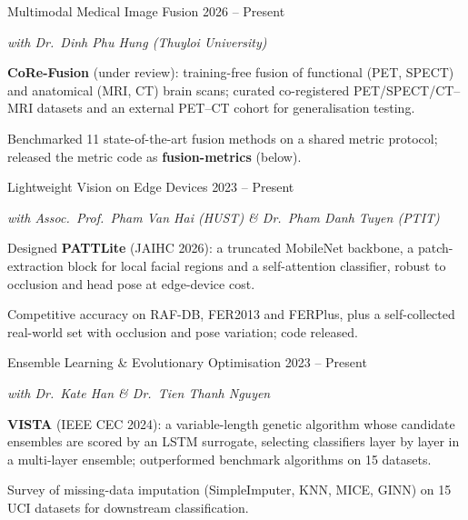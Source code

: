 \begin{cventries}
  \cventry
    {Multimodal Medical Image Fusion}
    {2026 -- Present}
    {
      \begin{cvitems}
        \item[] {\textit{with Dr.\ Dinh Phu Hung (Thuyloi University)}}
        \item {\textbf{CoRe-Fusion} (under review): training-free fusion of functional (PET, SPECT) and anatomical (MRI, CT) brain scans; curated co-registered PET/SPECT/CT--MRI datasets and an external PET--CT cohort for generalisation testing.}
        \item {Benchmarked 11 state-of-the-art fusion methods on a shared metric protocol; released the metric code as \textbf{fusion-metrics} (below).}
      \end{cvitems}
    }

\vspace{8pt}

  \cventry
    {Lightweight Vision on Edge Devices}
    {2023 -- Present}
    {
      \begin{cvitems}
        \item[] {\textit{with Assoc.\ Prof.\ Pham Van Hai (HUST) \& Dr.\ Pham Danh Tuyen (PTIT)}}
        \item {Designed \textbf{PATTLite} (JAIHC 2026): a truncated MobileNet backbone, a patch-extraction block for local facial regions and a self-attention classifier, robust to occlusion and head pose at edge-device cost.}
        \item {Competitive accuracy on RAF-DB, FER2013 and FERPlus, plus a self-collected real-world set with occlusion and pose variation; code released.}
      \end{cvitems}
    }

\vspace{8pt}

  \cventry
    {Ensemble Learning \& Evolutionary Optimisation}
    {2023 -- Present}
    {
      \begin{cvitems}
        \item[] {\textit{with Dr.\ Kate Han \& Dr.\ Tien Thanh Nguyen}}
        \item {\textbf{VISTA} (IEEE CEC 2024): a variable-length genetic algorithm whose candidate ensembles are scored by an LSTM surrogate, selecting classifiers layer by layer in a multi-layer ensemble; outperformed benchmark algorithms on 15 datasets.}
        \item {Survey of missing-data imputation (SimpleImputer, KNN, MICE, GINN) on 15 UCI datasets for downstream classification.}
      \end{cvitems}
    }
\end{cventries}

\vspace{10pt}
